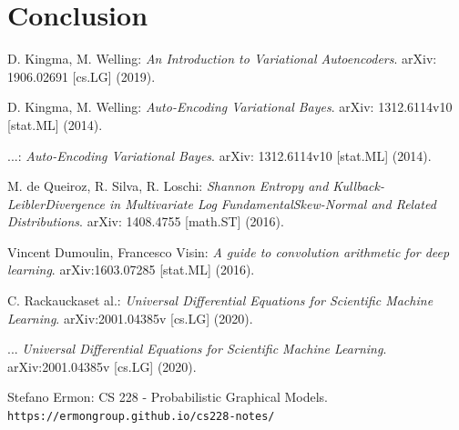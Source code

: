 \documentclass[12pt]{report}
\theoremstyle{definition}
\begin{document}
\chapter{Conclusion}


\medskip

\begin{thebibliography}{9}

D. Kingma, M. Welling:
\textit{An Introduction to Variational Autoencoders}.
arXiv: 1906.02691 [cs.LG] (2019).

D. Kingma, M. Welling:
\textit{Auto-Encoding Variational Bayes}.
arXiv: 1312.6114v10 [stat.ML] (2014).

...:
\textit{Auto-Encoding Variational Bayes}.
arXiv: 1312.6114v10 [stat.ML] (2014).

M. de Queiroz, R. Silva, R. Loschi:
\textit{Shannon Entropy and Kullback-LeiblerDivergence in Multivariate Log FundamentalSkew-Normal and Related Distributions}.
arXiv: 1408.4755 [math.ST] (2016).

Vincent Dumoulin, Francesco Visin:
\textit{A guide to convolution arithmetic for deep learning}.
arXiv:1603.07285 [stat.ML] (2016).

C. Rackauckaset al.:
\textit{Universal Differential Equations for Scientific Machine Learning}.
arXiv:2001.04385v [cs.LG] (2020).

...
\textit{Universal Differential Equations for Scientific Machine Learning}.
arXiv:2001.04385v [cs.LG] (2020).

Stefano Ermon: CS 228 - Probabilistic Graphical Models.
\\\texttt{https://ermongroup.github.io/cs228-notes/}
\end{thebibliography}
\end{document}
